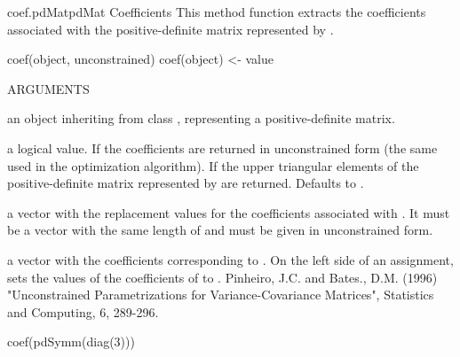 \documentclass[pdftex]{article} \usepackage{url,graphicx}
\begin{document}
\begin{Helpfile}{coef.pdMat}{pdMat Coefficients}
This method function extracts the coefficients associated with the
positive-definite matrix represented by .
\begin{Example}
coef(object, unconstrained)
coef(object) <- value
\end{Example}
\begin{Argument}{ARGUMENTS}
\item[\Co{object:}]
an object inheriting from class ,
representing a positive-definite matrix.
\item[\Co{unconstrained:}]
a logical value. If  the coefficients
are returned in unconstrained form (the same used in the optimization
algorithm). If  the upper triangular elements of the
positive-definite matrix represented by  are
returned. Defaults to .
\item[\Co{value:}]
a vector with the replacement values for the coefficients
associated with . It must be a vector with the same length
of  and must be given in unconstrained form.
\end{Argument}
a vector with the coefficients corresponding to .
On the left side of an assignment, sets the values of the coefficients
of  to .
Pinheiro, J.C. and Bates., D.M.  (1996) "Unconstrained Parametrizations
for Variance-Covariance Matrices", Statistics and Computing, 6, 289-296.
\need 15pt
\vspace{-16pt} 
\begin{Example}
coef(pdSymm(diag(3)))
\end{Example}
\end{Helpfile}
\end{document}

